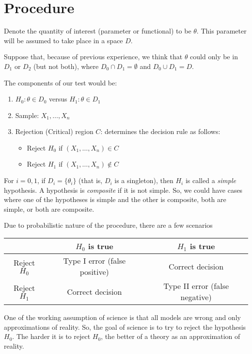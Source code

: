 \documentclass[
  openany]{book}
\providecommand{\tightlist}{%
  \setlength{\itemsep}{0pt}\setlength{\parskip}{0pt}}
\theoremstyle{definition}
\theoremstyle{definition}
\theoremstyle{definition}
\theoremstyle{definition}
\theoremstyle{remark}
\begin{document}
\hypertarget{procedure}{%
\section{Procedure}\label{procedure}}

Denote the quantity of interest (parameter or functional) to be \(\theta\).
This parameter will be assumed to take place in a space \(D\).

Suppose that, because of previous experience, we think that \(\theta\) could only be in \(D_1\) or \(D_2\)
(but not both), where \(D_0 \cap D_1 = \emptyset\) and \(D_0 \cup D_1 = D\).

The components of our test would be:

\begin{enumerate}
\def\labelenumi{\arabic{enumi}.}
\tightlist
\item
  \(H_0 : \theta \in D_0\) versus \(H_1: \theta \in D_1\)
\item
  Sample: \(X_1, \dots, X_n\)
\item
  Rejection (Critical) region \(C\): determines the decision rule as follows:

  \begin{itemize}
  \tightlist
  \item
    Reject \(H_0\) if \((X_1, \dots, X_n) \in C\)
  \item
    Reject \(H_1\) if \((X_1, \dots, X_n) \not\in C\)
  \end{itemize}
\end{enumerate}

For \(i=0,1\), if \(D_i = \{ \theta_i \}\) (that is, \(D_i\) is a singleton), then \(H_i\) is called a \emph{simple} hypothesis.
A hypothesis is \emph{composite} if it is not simple.
So, we could have cases where one of the hypotheses is simple and the other is composite,
both are simple, or both are composite.

Due to probabilistic nature of the procedure, there are a few scenarios

\begin{longtable}[]{@{}ccc@{}}
\toprule
& \(H_0\) is true & \(H_1\) is true\tabularnewline
\midrule
\endhead
Reject \(H_0\) & Type I error (false positive) & Correct decision\tabularnewline
Reject \(H_1\) & Correct decision & Type II error (false negative)\tabularnewline
\bottomrule
\end{longtable}

One of the working assumption of science is that all models are wrong and only approximations
of reality. So, the goal of science is to try to reject the hypothesis \(H_0\). The harder
it is to reject \(H_0\), the better of a theory as an approximation of reality.
\end{document}
